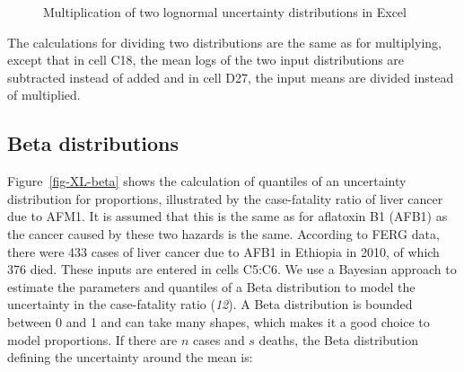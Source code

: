 \documentclass[
  letterpaper,
  DIV=11,
  numbers=noendperiod]{scrartcl}
\begin{document}
\begin{figure}


\caption{\label{fig-XL-lognorm}Multiplication of two lognormal
uncertainty distributions in Excel}

\end{figure}%

The calculations for dividing two distributions are the same as for
multiplying, except that in cell C18, the mean logs of the two input
distributions are subtracted instead of added and in cell D27, the input
means are divided instead of multiplied.

\subsection{Beta distributions}\label{beta-distributions}

Figure~\ref{fig-XL-beta} shows the calculation of quantiles of an
uncertainty distribution for proportions, illustrated by the
case-fatality ratio of liver cancer due to AFM1. It is assumed that this
is the same as for aflatoxin B1 (AFB1) as the cancer caused by these two
hazards is the same. According to FERG data, there were 433 cases of
liver cancer due to AFB1 in Ethiopia in 2010, of which 376 died. These
inputs are entered in cells C5:C6. We use a Bayesian approach to
estimate the parameters and quantiles of a Beta distribution to model
the uncertainty in the case-fatality ratio (\emph{12}). A Beta
distribution is bounded between 0 and 1 and can take many shapes, which
makes it a good choice to model proportions. If there are \(n\) cases
and \(s\) deaths, the Beta distribution defining the uncertainty around
the mean is:
\end{document}
